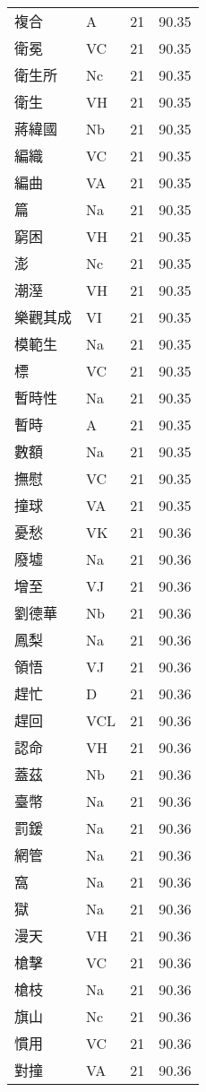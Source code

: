 \documentclass[twocolumn]{book}
\begin{document}
\begin{supertabular}{llrr}
複合 & A & 21 &  90.35\\
衛冕 & VC & 21 &  90.35\\
衛生所 & Nc & 21 &  90.35\\
衛生 & VH & 21 &  90.35\\
蔣緯國 & Nb & 21 &  90.35\\
編織 & VC & 21 &  90.35\\
編曲 & VA & 21 &  90.35\\
篇 & Na & 21 &  90.35\\
窮困 & VH & 21 &  90.35\\
澎 & Nc & 21 &  90.35\\
潮溼 & VH & 21 &  90.35\\
樂觀其成 & VI & 21 &  90.35\\
模範生 & Na & 21 &  90.35\\
標 & VC & 21 &  90.35\\
暫時性 & Na & 21 &  90.35\\
暫時 & A & 21 &  90.35\\
數額 & Na & 21 &  90.35\\
撫慰 & VC & 21 &  90.35\\
撞球 & VA & 21 &  90.35\\
憂愁 & VK & 21 &  90.36\\
廢墟 & Na & 21 &  90.36\\
增至 & VJ & 21 &  90.36\\
劉德華 & Nb & 21 &  90.36\\
鳳梨 & Na & 21 &  90.36\\
領悟 & VJ & 21 &  90.36\\
趕忙 & D & 21 &  90.36\\
趕回 & VCL & 21 &  90.36\\
認命 & VH & 21 &  90.36\\
蓋茲 & Nb & 21 &  90.36\\
臺幣 & Na & 21 &  90.36\\
罰鍰 & Na & 21 &  90.36\\
網管 & Na & 21 &  90.36\\
窩 & Na & 21 &  90.36\\
獄 & Na & 21 &  90.36\\
漫天 & VH & 21 &  90.36\\
槍擊 & VC & 21 &  90.36\\
槍枝 & Na & 21 &  90.36\\
旗山 & Nc & 21 &  90.36\\
慣用 & VC & 21 &  90.36\\
對撞 & VA & 21 &  90.36\\

\end{supertabular}
\end{document}
